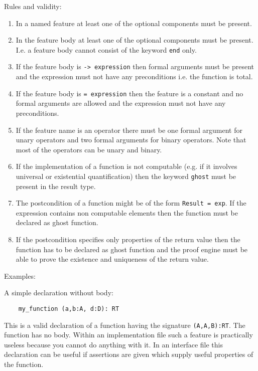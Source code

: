 \noindent Rules and validity:
\begin{enumerate}
\item In a named feature at least one of the optional components must be
  present.

\item In the feature body at least one of the optional components must be
  present. I.e. a feature body cannot consist of the keyword \lstinline!end! only.

\item If the feature body is \lstinline!-> expression! then formal arguments must be
  present and the expression must not have any preconditions i.e. the function
  is total.

\item If the feature body is \lstinline!= expression! then the feature is a constant and
  no formal arguments are allowed and the expression must not have any
  preconditions.

\item If the feature name is an operator there must be one formal argument for
  unary operators and two formal arguments for binary operators. Note that
  most of the operators can be unary and binary.

\item If the implementation of a function is not computable (e.g. if it
  involves universal or existential quantification) then the keyword
  \lstinline!ghost!  must be present in the result type.

\item The postcondition of a function might be of the form
  \lstinline!Result = exp!. If the expression contains non computable elements
  then the function must be declared as ghost function.

\item If the postcondition specifies only properties of the return value then
  the function has to be declared as ghost function and the proof engine must
  be able to prove the existence and uniqueness of the return value.
\end{enumerate}


\noindent Examples:

\noindent A simple declaration without body:
\begin{lstlisting}
    my_function (a,b:A, d:D): RT
\end{lstlisting}
%
This is a valid declaration of a function having the signature
\lstinline!(A,A,B):RT!. The function has no body. Within an implementation
file such a feature is practically useless because you cannot do anything with
it. In an interface file this declaration can be useful if assertions are
given which supply useful properties of the function.

